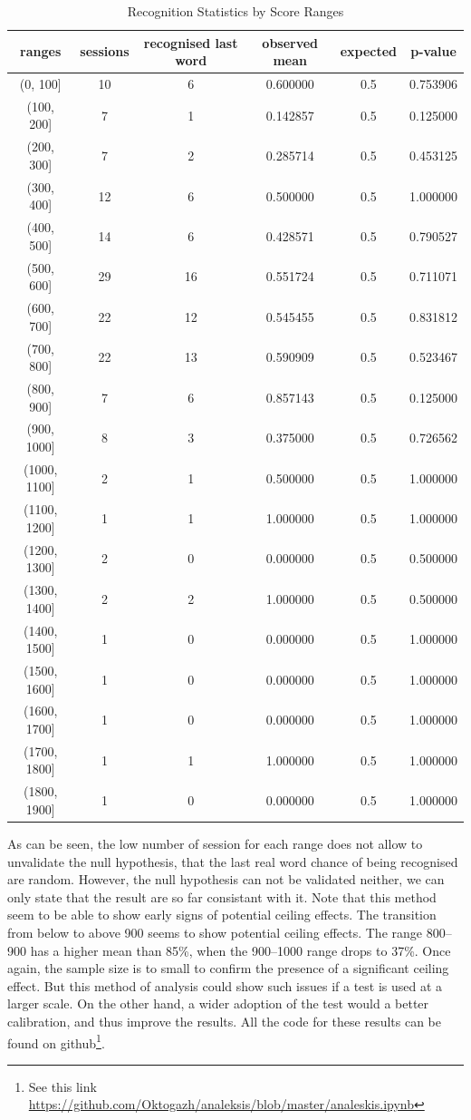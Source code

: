 \begin{table}[h]
\centering
\begin{tabular}{|c|c|c|c|c|c|}
\hline
\textbf{ranges} & \textbf{sessions} & \textbf{recognised last word} & \textbf{observed mean} & \textbf{expected} & \textbf{p-value} \\
\hline
(0, 100] & 10 & 6 & 0.600000 & 0.5 & 0.753906 \\
(100, 200] & 7 & 1 & 0.142857 & 0.5 & 0.125000 \\
(200, 300] & 7 & 2 & 0.285714 & 0.5 & 0.453125 \\
(300, 400] & 12 & 6 & 0.500000 & 0.5 & 1.000000 \\
(400, 500] & 14 & 6 & 0.428571 & 0.5 & 0.790527 \\
(500, 600] & 29 & 16 & 0.551724 & 0.5 & 0.711071 \\
(600, 700] & 22 & 12 & 0.545455 & 0.5 & 0.831812 \\
(700, 800] & 22 & 13 & 0.590909 & 0.5 & 0.523467 \\
(800, 900] & 7 & 6 & 0.857143 & 0.5 & 0.125000 \\
(900, 1000] & 8 & 3 & 0.375000 & 0.5 & 0.726562 \\
(1000, 1100] & 2 & 1 & 0.500000 & 0.5 & 1.000000 \\
(1100, 1200] & 1 & 1 & 1.000000 & 0.5 & 1.000000 \\
(1200, 1300] & 2 & 0 & 0.000000 & 0.5 & 0.500000 \\
(1300, 1400] & 2 & 2 & 1.000000 & 0.5 & 0.500000 \\
(1400, 1500] & 1 & 0 & 0.000000 & 0.5 & 1.000000 \\
(1500, 1600] & 1 & 0 & 0.000000 & 0.5 & 1.000000 \\
(1600, 1700] & 1 & 0 & 0.000000 & 0.5 & 1.000000 \\
(1700, 1800] & 1 & 1 & 1.000000 & 0.5 & 1.000000 \\
(1800, 1900] & 1 & 0 & 0.000000 & 0.5 & 1.000000 \\
\hline
\end{tabular}
\caption{Recognition Statistics by Score Ranges}
\label{tab:recognition_stats}
\end{table}

As can be seen, the low number of session for each range does not allow to unvalidate the null hypothesis, that the last real word chance of being recognised are random. However, the null hypothesis can not be validated neither, we can only state that the result are so far consistant with it. Note that this method seem to be able to show early signs of potential ceiling effects. The transition from below to above 900 seems to show potential ceiling effects. The range 800–900 has a higher mean than 85\%, when the 900–1000 range drops to 37\%. Once again, the sample size is to small to confirm the presence of a significant ceiling effect. But this method of analysis could show such issues if a test is used at a larger scale. On the other hand, a wider adoption of the test would a better calibration, and thus improve the results. All the code for these results can be found on github\footnote{See this link \url{https://github.com/Oktogazh/analeksis/blob/master/analeskis.ipynb}}.

